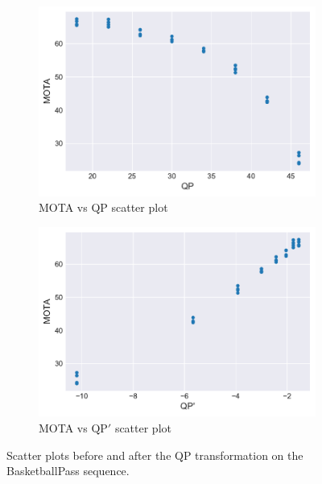 
\begin{figure}[!tb]
  \centering
  \begin{subfigure}[b]{.5\textwidth}
    \includegraphics[width=\textwidth]{img/QP_transformation_before.pdf}
    \caption{MOTA vs QP scatter plot}
    \label{fig:QP_transformation_before}
  \end{subfigure}%
  \begin{subfigure}[b]{.5\textwidth}
    \includegraphics[width=\textwidth]{img/QP_transformation_after.pdf}
    \caption{MOTA vs $\text{QP}'$ scatter plot}
    \label{fig:QP_transformation_after}
  \end{subfigure}
  \caption[Scatter plots before and after the QP transformation on the BasketballPass sequence]{%
    Scatter plots before and after the QP transformation on the BasketballPass sequence.%
  }
  \label{fig:QP_transformation}
\end{figure}